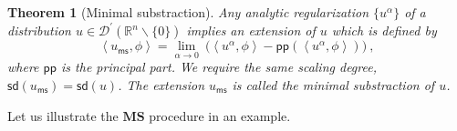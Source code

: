 \documentclass[11pt]{book}
\newcommand{\pp}{\mathsf{pp}}
\newcommand{\ms}{\mathsf{ms}}
\newcommand{\sd}{\mathsf{sd}}
\newcommand{\MS}{\textbf{MS}}
\newcommand{\sm}[1]{\left\langle#1\right\rangle}
\newcommand{\Dcal}{\mathcal{D}}
\newcommand{\Rbb}{\mathbb{R}}
\theoremstyle{break}
\newtheorem{theorem}{Theorem}[chapter]
\begin{document}
\begin{theorem}[Minimal substraction]\label{theo:ms_mumeric}
Any analytic regularization $\{u^\alpha\}$ of a distribution $u \in \Dcal^\prime(\Rbb^n \backslash \{0\})$ implies an extension of $u$ which is defined by 
%
\begin{equation*}
\sm{u_\ms,\phi} = \lim_{\alpha \to 0} \ \bigg( \sm{u^\alpha , \phi} - \pp\left(\sm{u^\alpha , \phi}\right) \bigg) \ ,
\end{equation*}
%
where $\pp$ is the principal part. We require the same scaling degree, $\sd(u_\ms) = \sd(u)$. The extension $u_\ms$ is called the minimal substraction of $u$.
\end{theorem}


\bigskip


Let us illustrate the $\MS$ procedure in an example. 
\end{document}
